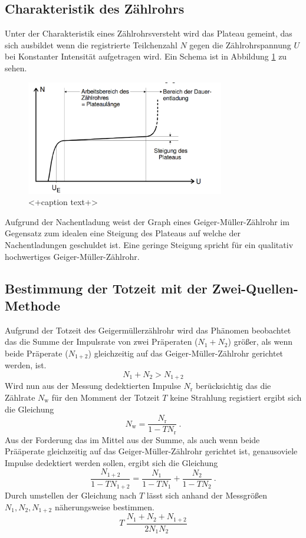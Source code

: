 \subsection{Charakteristik des Zählrohrs}
Unter der Charakteristik eines Zählrohrsversteht wird das Plateau gemeint, das sich ausbildet wenn die registrierte Teilchenzahl $N$ gegen die Zählrohrspannung $U$ bei Konstanter Intensität aufgetragen wird. Ein Schema ist in Abbildung \ref{fig:Pla} zu sehen.
\begin{figure}
  \centering
  \includegraphics[height=5cm]{picture/Plateau.pdf}
  \caption{<+caption text+>}
  \label{fig:Pla}
\end{figure}
Aufgrund der Nachentladung weist der Graph eines Geiger-Müller-Zählrohr im Gegensatz zum idealen eine Steigung des Plateaus auf welche der Nachentladungen geschuldet ist. Eine geringe Steigung spricht für ein qualitativ hochwertiges Geiger-Müller-Zählrohr.


\subsection{Bestimmung der Totzeit mit der Zwei-Quellen-Methode}
Aufgrund der Totzeit des Geigermüllerzählrohr wird das Phänomen beobachtet das die Summe der Impulsrate von zwei Präperaten ($N_1 + N_2$) größer, als wenn beide Präperate ($N_{1+2}$) gleichzeitig auf das Geiger-Müller-Zählrohr gerichtet werden, ist.
\begin{equation}
  	N_1 + N_2 > N_{1+2}
  \label{eqn:ungl}
\end{equation}
Wird nun aus der Messung dedektierten Impulse $N_\text{r}$ berücksichtig das die Zählrate $N_\text{w}$ für den Momment der Totzeit $T$ keine Strahlung registiert ergibt sich die Gleichung
\begin{equation}
  N_\text{w} = \frac{N_\text{r}}{1 - T N_\text{r} } \ .
  \label{eqn:zaelr}
\end{equation}
Aus der Forderung das im Mittel aus der Summe, als auch wenn beide Prääperate gleichzeitig auf das Geiger-Müller-Zählrohr gerichtet ist, genausoviele Impulse dedektiert werden sollen, ergibt sich die Gleichung
\begin{equation}
  \frac{N_{1+2}}{1-TN_{1+2}} = \frac{N_{1}}{1-TN_{1}} + \frac{N_{2}}{1-TN_{2}} \ .
\end{equation}
Durch umstellen der Gleichung nach $T$ lässt sich anhand der Messgrößen $N_1, N_2, N_{1+2}$ näherungsweise bestimmen.
\begin{equation}
  T ~ \frac{N_1 + N_2 + N_{1+2}}{2 N_1 N_2}
  \label{eqn:T}
\end{equation}


